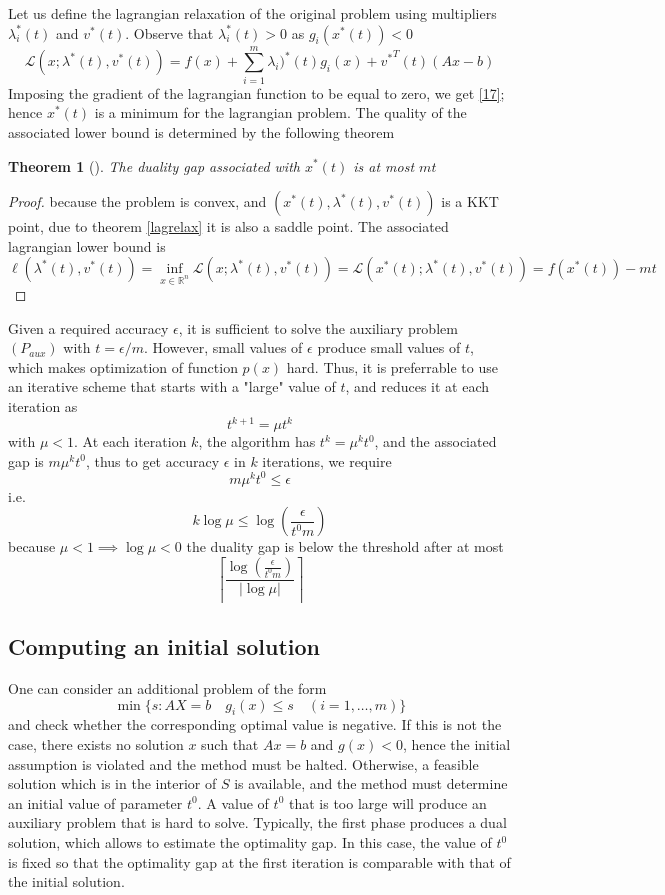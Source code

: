 \documentclass{book}
\newcommand{\R}{\mathbb{R}}
\theoremstyle{theoremv2}
\newtheorem{theorem}{Theorem}[chapter]
\theoremstyle{defv2}
\theoremstyle{remark}
\theoremstyle{remark}
\begin{document}
Let us define the lagrangian relaxation of the original problem using multipliers $\lambda_i^*(t)$ and $v^*(t)$. Observe that $\lambda_i^*(t)>0$ as $g_i(x^*(t))<0$
\[
    \mathcal{L}(x;\lambda^*(t),v^*(t)) = f(x) + \displaystyle\sum_{i=1}^{m}\lambda_i)^*(t)g_i(x) + {v^*}^T(t)(Ax-b)
\]
Imposing the gradient of the lagrangian function to be equal to zero, we get \eqref{17}; hence $x^*(t)$ is a minimum for the lagrangian problem. The quality of the associated lower bound is determined by the following theorem
\begin{theorem}[]
    The duality gap associated with $x^*(t)$ is at most $mt$
\end{theorem}
\begin{proof}
    because the problem is convex, and $(x^*(t),\lambda^*(t),v^*(t))$ is a KKT point, due to theorem \ref{lagrelax} it is also a saddle point. The associated lagrangian lower bound is 
    \[
        \ell(\lambda^*(t),v^*(t)) = \inf_{x\in\R^n}\mathcal{L}(x;\lambda^*(t),v^*(t)) = \mathcal{L}(x^*(t);\lambda^*(t),v^*(t)) = f(x^*(t))-mt
    \]
\end{proof}
Given a required accuracy $\epsilon$, it is sufficient to solve the auxiliary problem $(P_{aux})$ with $t=\epsilon/m$. However, small values of $\epsilon$ produce small values of $t$, which makes optimization of function $p(x)$ hard. Thus, it is preferrable to use an iterative scheme that starts with a "large" value of $t$, and reduces it at each iteration as 
\[
    t^{k+1} = \mu t^k
\]
with $\mu<1$. At each iteration $k$, the algorithm has $t^k = \mu^k t^0$, and the associated gap is $m \mu^kt^0$, thus to get accuracy $\epsilon$ in $k$ iterations, we require 
\[
    m \mu^kt^0\leq \epsilon
\]
i.e. 
\[
    k \log \mu \leq \log \left(\displaystyle\frac{\epsilon}{t^0m}\right)
\]
because $\mu<1\implies \log\mu<0$ the duality gap is below the threshold after at most \[
    \left\lceil \displaystyle\frac{\log\left(\displaystyle\frac{\epsilon}{t^0m}\right)}{|\log\mu|} \right\rceil
\]
\subsection{Computing an initial solution}
One can consider an additional problem of the form 
\[
    \min\{ s: AX=b \quad g_i(x)\leq s \quad (i=1,\dots,m) \}
\]
and check whether the corresponding optimal value is negative. If this is not the case, there exists no solution $x$ such that $Ax=b$ and $g(x)<0$, hence the initial assumption is violated and the method must be halted. Otherwise, a feasible solution which is in the interior of $S$ is available, and the method must determine an initial value of parameter $t^0$. A value of $t^0$ that is too large will produce an auxiliary problem that is hard to solve. Typically, the first phase produces a dual solution, which allows to estimate the optimality gap. In this case, the value of $t^0$ is fixed so that the optimality gap at the first iteration is comparable with that of the initial solution.
\end{document}

